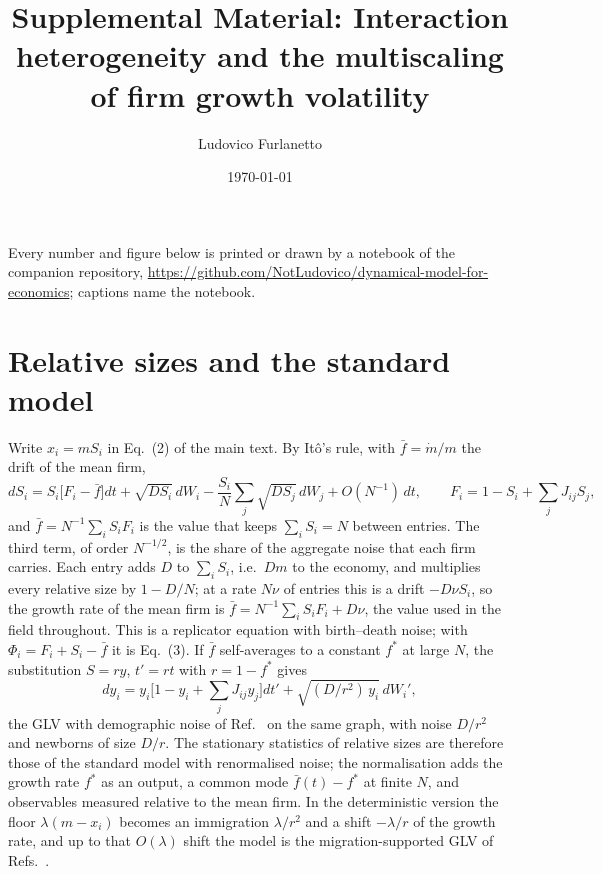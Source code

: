 \documentclass[pre,onecolumn,superscriptaddress,nofootinbib]{revtex4-2}
\begin{document}
\title{Supplemental Material: Interaction heterogeneity and the multiscaling of firm growth volatility}
\author{Ludovico Furlanetto}
\date{\today}
\maketitle

\noindent Every number and figure below is printed or drawn by a notebook of the companion repository,
\url{https://github.com/NotLudovico/dynamical-model-for-economics}; captions name the notebook.

\section{Relative sizes and the standard model}
\label{sec:relative}

Write $x_i=mS_i$ in Eq.~(2) of the main text.  By It\^o's rule, with $\bar f=\dot m/m$ the drift of the
mean firm,
\begin{equation}
dS_i=S_i\big[F_i-\bar f\big]dt+\sqrt{DS_i}\,dW_i-\frac{S_i}{N}\sum_j\sqrt{DS_j}\,dW_j+O(N^{-1})\,dt,\qquad
F_i=1-S_i+\sum_jJ_{ij}S_j ,
\label{eq:rel}
\end{equation}
and $\bar f=N^{-1}\sum_iS_iF_i$ is the value that keeps $\sum_iS_i=N$ between entries.  The third term, of order
$N^{-1/2}$, is the share of the aggregate noise that each firm carries.  Each entry adds $D$ to $\sum_iS_i$, i.e.\
$Dm$ to the economy, and multiplies every relative size by $1-D/N$; at a rate $N\nu$ of entries this is a drift
$-D\nu S_i$, so the growth rate of the mean firm is $\bar f=N^{-1}\sum_iS_iF_i+D\nu$, the value used in the field
throughout.  This is a replicator equation
with birth--death noise; with $\Phi_i=F_i+S_i-\bar f$ it is Eq.~(3).  If $\bar f$ self-averages to a constant
$f^*$ at large $N$, the substitution $S=ry$, $t'=rt$ with $r=1-f^*$ gives
\begin{equation}
dy_i=y_i\Big[1-y_i+\sum_jJ_{ij}y_j\Big]dt'+\sqrt{(D/r^2)\,y_i}\,dW_i' ,
\end{equation}
the GLV with demographic noise of Ref.~\cite{altieri2021} on the same graph, with noise $D/r^2$ and newborns
of size $D/r$.  The
stationary statistics of relative sizes are therefore those of the standard model with renormalised
noise; the normalisation adds the growth rate $f^*$ as an output, a common mode $\bar f(t)-f^*$ at
finite $N$, and observables measured relative to the mean firm.  In the deterministic version the
floor $\lambda(m-x_i)$ becomes an immigration $\lambda/r^2$ and a shift $-\lambda/r$ of the growth rate, and up to
that $O(\lambda)$ shift the model is the migration-supported GLV of Refs.~\cite{bunin2017,mallmin2024}.
\end{document}
